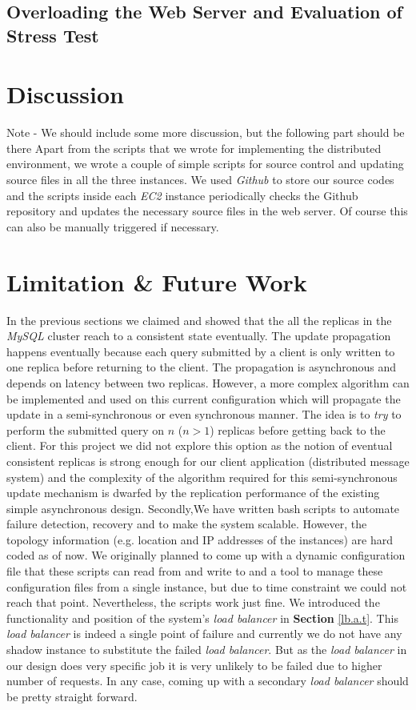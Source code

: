 \documentclass[12pt]{article}
\begin{document}
\subsection{Overloading the Web Server and Evaluation of Stress Test}

\section{Discussion}
Note -  We should include some more discussion, but the following part should be there 
Apart from the scripts that we wrote for implementing the distributed environment, we wrote a couple of simple scripts for source control and updating source files in all the three instances. We used \emph{Github} \cite{github} to store our source codes and the scripts inside each \emph{EC2} instance periodically checks the {Github} repository and updates the necessary source files in the web server. Of course this can also be manually triggered if necessary.

\section{Limitation \& Future Work}

In the previous sections we claimed and showed that the all the replicas in the \emph{MySQL} cluster reach to a consistent state eventually. The update propagation happens eventually because each query submitted by a client is only written to one replica before returning to the client. The propagation is asynchronous and depends on latency between two replicas. However, a more complex algorithm can be implemented and used on this current configuration which will propagate the update in a semi-synchronous or even synchronous manner. The idea is to \emph{try} to perform the submitted query on $n$ ($n > 1$) replicas before getting back to the client. For this project we did not explore this option as the notion of eventual consistent replicas is strong enough for our client application (distributed message system) and the complexity of the algorithm required for this semi-synchronous update mechanism is dwarfed by the replication performance of the existing simple asynchronous design. Secondly,We have written bash scripts to automate failure detection, recovery and to make the system scalable. However, the topology information (e.g. location and IP addresses of the instances) are hard coded as of now. We originally planned to come up with a dynamic configuration file that these scripts can read from and write to and a tool to manage these configuration files from a single instance, but due to time constraint we could not reach that point. Nevertheless, the scripts work just fine. We introduced the functionality and position of the system\rq{}s \emph{load balancer} in \textbf{Section } \ref{lb.a.t}. This \emph{load balancer} is indeed a single point of failure and currently we do not have any shadow instance to substitute the failed \emph{load balancer}. But as the \emph{load balancer} in our design does very specific job it is very unlikely to be failed due to higher number of requests. In any case, coming up with a secondary \emph{load balancer} should be pretty straight forward. 
\end{document}
